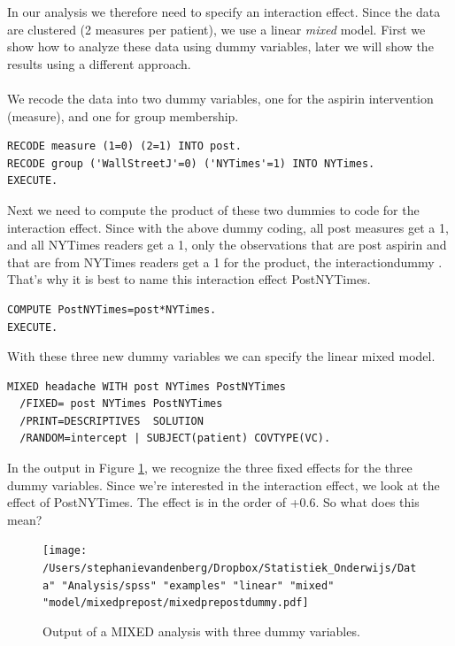 \documentclass[]{book}\usepackage[]{graphicx}\usepackage[]{color}
\begin{document}
In our analysis we therefore need to specify an interaction effect. Since the data are clustered (2 measures per patient), we use a linear \textit{mixed} model. First we show how to analyze these data using dummy variables, later we will show the results using a different approach. 
\\
\\
We recode the data into two dummy variables, one for the aspirin intervention (measure), and one for group membership. 

\begin{verbatim}
RECODE measure (1=0) (2=1) INTO post.
RECODE group ('WallStreetJ'=0) ('NYTimes'=1) INTO NYTimes.
EXECUTE.
\end{verbatim}

Next we need to compute the product of these two dummies to code for the interaction effect. Since with the above dummy coding, all post measures get a 1, and all NYTimes readers get a 1, only the observations that are post aspirin and that are from NYTimes readers get a 1 for the product, the interactiondummy . That's why it is best to name this interaction effect PostNYTimes. 

\begin{verbatim}
COMPUTE PostNYTimes=post*NYTimes.
EXECUTE.
\end{verbatim}

With these three new dummy variables we can specify the linear mixed model.

\begin{verbatim}
MIXED headache WITH post NYTimes PostNYTimes
  /FIXED= post NYTimes PostNYTimes
  /PRINT=DESCRIPTIVES  SOLUTION
  /RANDOM=intercept | SUBJECT(patient) COVTYPE(VC).
\end{verbatim}


In the output in Figure \ref{fig:mixedprepostdummy}, we recognize the three fixed effects for the three dummy variables. Since we're interested in the interaction effect, we look at the effect of PostNYTimes. The effect is in the order of +0.6. So what does this mean? 

\begin{figure}[h]
    \begin{center}
       \texttt{[image: /Users/stephanievandenberg/Dropbox/Statistiek\_Onderwijs/Data" "Analysis/spss" "examples" "linear" "mixed" "model/mixedprepost/mixedprepostdummy.pdf]}
    \end{center}
    \label{fig:mixedprepostdummy}
    \caption{Output of a MIXED analysis with three dummy variables.}
\end{figure}
\end{document}
